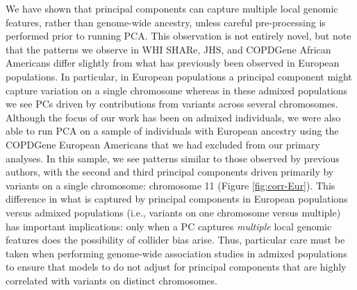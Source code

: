 \documentclass[12pt]{article}
\newcommand{\edit}[1]{{\color{red}{#1}}}
\begin{document}
We have shown that principal components can capture multiple local genomic features, rather than genome-wide ancestry, unless careful pre-processing is performed prior to running PCA.
This observation is not entirely novel, but note that the patterns we observe in WHI SHARe, JHS, and COPDGene African Americans differ slightly from what has previously been observed in European populations.
In particular, in European populations a principal component might capture variation on a single chromosome \edit{add citations} whereas in these admixed populations we see PCs driven by contributions from variants across several chromosomes.
Although the focus of our work has been on admixed individuals, we were also able to run PCA on a sample of individuals with European ancestry using the COPDGene European Americans that we had excluded from our primary analyses. 
In this sample, we see patterns similar to those observed by previous authors, with the second and third principal components driven primarily by variants on a single chromosome: chromosome 11 (Figure \ref{fig:corr-Eur}).
This difference in what is captured by principal components in European populations versus admixed populations (i.e., variants on one chromosome versus multiple) has important implications: only when a PC captures \textit{multiple} local genomic features does the possibility of collider bias arise.
Thus, particular care must be taken when performing genome-wide association studies in admixed populations to ensure that models to do not adjust for principal components that are highly correlated with variants on distinct chromosomes.
\end{document}
